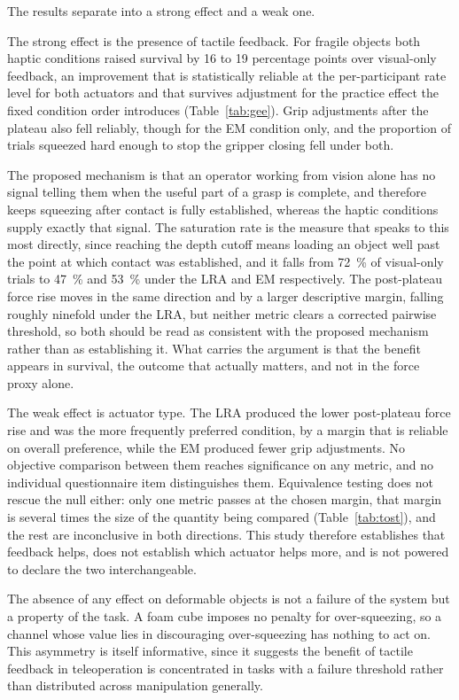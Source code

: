 \documentclass[12pt, a4paper, twoside, openright]{report}
\begin{document}
The results separate into a strong effect and a weak one.

The strong effect is the presence of tactile feedback. For fragile objects both
haptic conditions raised survival by 16 to 19 percentage points over
visual-only feedback, an improvement that is statistically reliable at the
per-participant rate level for both actuators and that survives adjustment for
the practice effect the fixed condition order introduces
(Table~\ref{tab:gee}). Grip adjustments after the plateau also fell reliably,
though for the EM condition only, and the proportion of trials squeezed hard
enough to stop the gripper closing fell under both.

The proposed mechanism is that an operator working from vision alone has no
signal telling them when the useful part of a grasp is complete, and therefore
keeps squeezing after contact is fully established, whereas the haptic
conditions supply exactly that signal. The saturation rate is the measure that
speaks to this most directly, since reaching the depth cutoff means loading an
object well past the point at which contact was established, and it falls from
\SI{72}{\percent} of visual-only trials to \SI{47}{\percent} and
\SI{53}{\percent} under the LRA and EM respectively. The post-plateau force
rise moves in the same direction and by a larger descriptive margin, falling
roughly ninefold under the LRA, but neither metric clears a corrected pairwise
threshold, so both should be read as consistent with the proposed mechanism
rather than as establishing it. What carries the argument is that the benefit
appears in survival, the outcome that actually matters, and not in the force
proxy alone.

The weak effect is actuator type. The LRA produced the lower post-plateau force
rise and was the more frequently preferred condition, by a margin that is
reliable on overall preference, while the EM produced fewer grip adjustments.
No objective comparison between them reaches significance on any metric, and no
individual questionnaire item distinguishes them. Equivalence testing does not
rescue the null either: only one metric passes at the chosen margin, that
margin is several times the size of the quantity being compared
(Table~\ref{tab:tost}), and the rest are inconclusive in both directions. This
study therefore establishes that feedback helps, does not establish which
actuator helps more, and is not powered to declare the two interchangeable.

The absence of any effect on deformable objects is not a failure of the system
but a property of the task. A foam cube imposes no penalty for over-squeezing,
so a channel whose value lies in discouraging over-squeezing has nothing to act
on. This asymmetry is itself informative, since it suggests the benefit of
tactile feedback in teleoperation is concentrated in tasks with a failure
threshold rather than distributed across manipulation generally.
\end{document}
